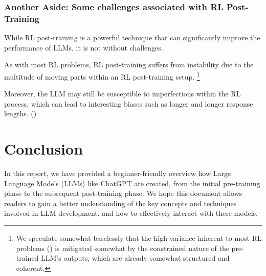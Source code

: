 \documentclass{article} %
\begin{document}
\subsubsection{Another Aside: Some challenges associated with RL Post-Training}
While RL post-training is a powerful technique that can significantly improve the performance of LLMs,
it is not without challenges.

As with most RL problems, RL post-training suffers from instability due to
the multitude of moving parts within an RL post-training setup.
\cite{Jones-2021}
\footnote{
    We speculate somewhat baselessly that the high variance inherent to most RL problems 
    (\cite{Bjorck-et-al-2022, Irpan-2018})
    is mitigated somewhat by the constrained nature of the pre-trained LLM's outputs,
    which are already somewhat structured and coherent.
}

Moreover, the LLM may still be susceptible to imperfections within the RL process,
which can lead to interesting biases such as longer and longer response lengths.
(\cite{Liu-et-al-2025})

\section{Conclusion}
In this report, we have provided a beginner-friendly overview how Large Language Models (LLMs) like ChatGPT are created,
from the initial pre-training phase to the subsequent post-training phase.
We hope this document allows readers to gain a better understanding of the key concepts and techniques involved in LLM development,
and how to effectively interact with these models.




\appendix
\end{document}
